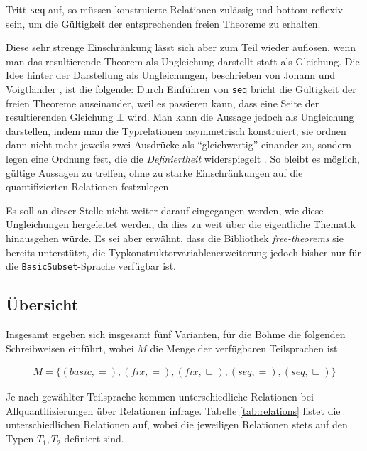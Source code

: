 Tritt \texttt{seq} auf, so müssen konstruierte Relationen zulässig und bottom-reflexiv sein, um die Gültigkeit der
entsprechenden freien Theoreme zu erhalten.

Diese sehr strenge Einschränkung lässt sich aber zum Teil wieder auflösen, wenn man das resultierende Theorem als
Ungleichung darstellt statt als Gleichung.
Die Idee hinter der Darstellung als Ungleichungen, beschrieben von Johann und Voigtländer \cite{johann}, ist die folgende: Durch Einführen von \texttt{seq} bricht die Gültigkeit der
freien Theoreme auseinander, weil es passieren kann, dass eine Seite der resultierenden Gleichung $\bot$ wird.
Man kann die Aussage jedoch als Ungleichung darstellen, indem man die Typrelationen asymmetrisch konstruiert; sie
ordnen dann nicht mehr jeweils zwei Ausdrücke als ``gleichwertig'' einander zu, sondern legen eine Ordnung fest, die
die \textit{Definiertheit} widerspiegelt \cite{johann}. So bleibt es möglich, gültige Aussagen zu treffen, ohne zu starke
Einschränkungen auf die quantifizierten Relationen festzulegen.

Es soll an dieser Stelle nicht weiter darauf eingegangen werden, wie diese Ungleichungen hergeleitet werden, da dies zu weit
über die eigentliche Thematik hinausgehen würde. Es sei aber erwähnt, dass die Bibliothek \textit{free-theorems} sie bereits
unterstützt, die Typkonstruktorvariablenerweiterung jedoch bisher nur für die \texttt{BasicSubset}-Sprache verfügbar ist.


\subsection{Übersicht}

Insgesamt ergeben sich insgesamt fünf Varianten, für die Böhme \cite{freetheorems} die folgenden Schreibweisen einführt,
wobei $M$ die Menge der verfügbaren Teilsprachen ist.

\begin{align*}
M = \{(basic, =), (fix, =), (fix, \sqsubseteq), (seq, =), (seq, \sqsubseteq)\}
\end{align*}

Je nach gewählter Teilsprache kommen unterschiedliche Relationen bei Allquantifizierungen über Relationen infrage. Tabelle
\ref{tab:relations} listet die unterschiedlichen Relationen auf, wobei die jeweiligen Relationen
stets auf den Typen $T_1, T_2$ definiert sind.


